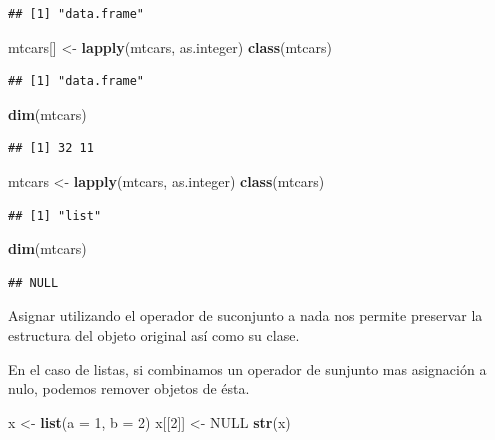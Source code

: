 \documentclass[]{article}
\newenvironment{Shaded}{\begin{snugshade}}{\end{snugshade}}
\newcommand{\KeywordTok}[1]{\textcolor[rgb]{0.13,0.29,0.53}{\textbf{{#1}}}}
\newcommand{\DataTypeTok}[1]{\textcolor[rgb]{0.13,0.29,0.53}{{#1}}}
\newcommand{\DecValTok}[1]{\textcolor[rgb]{0.00,0.00,0.81}{{#1}}}
\newcommand{\StringTok}[1]{\textcolor[rgb]{0.31,0.60,0.02}{{#1}}}
\newcommand{\OtherTok}[1]{\textcolor[rgb]{0.56,0.35,0.01}{{#1}}}
\newcommand{\NormalTok}[1]{{#1}}
\begin{document}
\begin{verbatim}
## [1] "data.frame"
\end{verbatim}

\begin{Shaded}
\begin{Highlighting}[]
\NormalTok{mtcars[] <-}\StringTok{ }\KeywordTok{lapply}\NormalTok{(mtcars, as.integer)}
\KeywordTok{class}\NormalTok{(mtcars)}
\end{Highlighting}
\end{Shaded}

\begin{verbatim}
## [1] "data.frame"
\end{verbatim}

\begin{Shaded}
\begin{Highlighting}[]
\KeywordTok{dim}\NormalTok{(mtcars)}
\end{Highlighting}
\end{Shaded}

\begin{verbatim}
## [1] 32 11
\end{verbatim}

\begin{Shaded}
\begin{Highlighting}[]
\NormalTok{mtcars <-}\StringTok{ }\KeywordTok{lapply}\NormalTok{(mtcars, as.integer)}
\KeywordTok{class}\NormalTok{(mtcars)}
\end{Highlighting}
\end{Shaded}

\begin{verbatim}
## [1] "list"
\end{verbatim}

\begin{Shaded}
\begin{Highlighting}[]
\KeywordTok{dim}\NormalTok{(mtcars)}
\end{Highlighting}
\end{Shaded}

\begin{verbatim}
## NULL
\end{verbatim}

Asignar utilizando el operador de suconjunto a nada nos permite
preservar la estructura del objeto original así como su clase.

En el caso de listas, si combinamos un operador de sunjunto mas
asignación a nulo, podemos remover objetos de ésta.

\begin{Shaded}
\begin{Highlighting}[]
\NormalTok{x <-}\StringTok{ }\KeywordTok{list}\NormalTok{(}\DataTypeTok{a =} \DecValTok{1}\NormalTok{, }\DataTypeTok{b =} \DecValTok{2}\NormalTok{)}
\NormalTok{x[[}\DecValTok{2}\NormalTok{]] <-}\StringTok{ }\OtherTok{NULL}
\KeywordTok{str}\NormalTok{(x)}
\end{Highlighting}
\end{Shaded}
\end{document}
